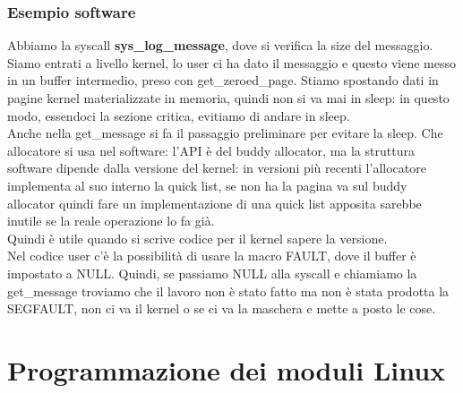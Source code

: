 \documentclass[12pt, oneside]{extbook}
\begin{document}
\subsection*{Esempio software}
Abbiamo la syscall \textbf{sys\_log\_message}, dove si verifica la size del messaggio. Siamo entrati a livello kernel, lo user ci ha dato il messaggio e questo viene messo in un buffer intermedio, preso con get\_zeroed\_page. Stiamo spostando dati in pagine kernel materializzate in memoria, quindi non si va mai in sleep: in questo modo, essendoci la sezione critica, evitiamo di andare in sleep.\\ Anche nella get\_message si fa il passaggio preliminare per evitare la sleep. Che allocatore si usa nel software: l'API è del buddy allocator, ma la struttura software dipende dalla versione del kernel: in versioni più recenti l'allocatore implementa al suo interno la quick list, se non ha la pagina va sul buddy allocator quindi fare un implementazione di una quick list apposita sarebbe inutile se la reale operazione lo fa già.\\Quindi è utile quando si scrive codice per il kernel sapere la versione.\\ Nel codice user c'è la possibilità di usare la macro FAULT, dove il buffer è impostato a NULL. Quindi, se passiamo NULL alla syscall e chiamiamo la get\_message troviamo che il lavoro non è stato fatto ma non è stata prodotta la SEGFAULT, non ci va il kernel o se ci va la maschera e mette a posto le cose.
\chapter{Programmazione dei moduli Linux}
\end{document}
